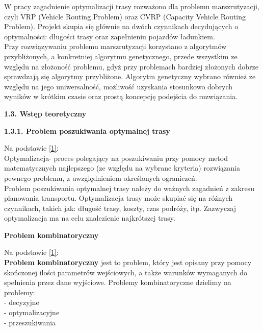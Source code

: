 \documentclass[a4paper, twoside, 12pt, justified]{article}
\begin{document}
	W pracy zagadnienie optymalizacji trasy rozważono dla problemu marszrutyzacji, czyli VRP (Vehicle Routing Problem) oraz CVRP (Capacity Vehicle Routing Problem). Projekt skupia się głównie na dwóch czynnikach decydujących o optymalności: długości trasy oraz zapełnieniu pojazdów ładunkiem. \\
	Przy rozwiązywaniu problemu marszrutyzacji korzystano z algorytmów przybliżonych, a konkretniej algorytmu genetycznego, przede wszystkim ze względu na złożoność problemu, gdyż przy problemach bardziej złożonych dobrze sprawdzają się algorytmy przybliżone. Algorytm genetyczny wybrano również ze względu na jego uniwersalność, możliwość uzyskania stosunkowo dobrych wyników w krótkim czasie oraz prostą koncepcję podejścia do rozwiązania. \\
	
	
	\newpage
	\begin{flushleft}
		\begin{LARGE}
			\textbf{1.3. Wstęp teoretyczny}
		\end{LARGE}
	\end{flushleft}

	\begin{large}
		\textbf{1.3.1. Problem poszukiwania optymalnej trasy}
	\end{large}
	\vspace{5mm} %
	
	Na podstawie \hyperlink{optymalizacja}{[1]}:\\
	Optymalizacja- proces polegający na poszukiwaniu przy pomocy metod matematycznych najlepszego (ze względu na wybrane kryteria) rozwiązania pewnego problemu, z uwzględnieniem określonych ograniczeń. \\
	Problem poszukiwania optymalnej trasy należy do ważnych zagadnień z zakresu planowania transportu. Optymalizacja trasy może skupiać się na różnych czynnikach, takich jak: długość trasy, koszty, czas podróży, itp.
	Zazwyczaj optymalizacja ma na celu znalezienie najkrótszej trasy.\\
	
	\begin{large}
		\begin{center}
			\textbf{Problem kombinatoryczny}
		\end{center}
	\end{large}
	
	Na podstawie \hyperlink{problemy}{[1]}:\\
	\textbf{Problem kombinatoryczny}  jest to problem, który jest opisany przy pomocy skończonej ilości parametrów
	wejściowych, a także warunków wymaganych do spełnienia przez dane wyjściowe. Problemy kombinatoryczne dzielimy na problemy:\\
	- decyzyjne\\
	- optymalizacyjne\\
	- przeszukiwania
	
\end{document}

